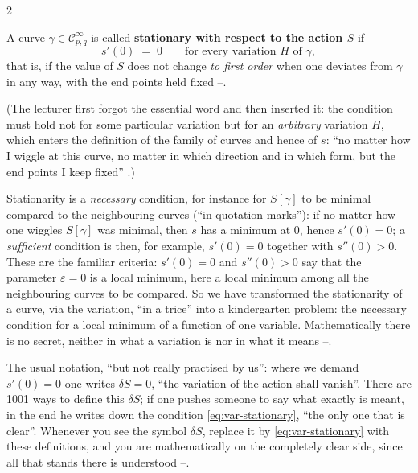 \begin{paracol}{2}
\begin{definition}\label{def:var-stationary}
A curve $\gamma\in\mathcal C^\infty_{p,q}$ is called \textbf{stationary with respect to the action $S$} if
\begin{equation}\label{eq:var-stationary}
  s'(0)\;=\;0\qquad\text{for every variation }H\text{ of }\gamma ,
\end{equation}
that is, if the value of $S$ does not change \emph{to first order} when one deviates from $\gamma$ in any way, with the end points held fixed --.
\end{definition}
(The lecturer first forgot the essential word and then inserted it: the condition must hold not for some particular variation but for an \emph{arbitrary} variation $H$, which enters the definition of the family of curves and hence of $s$: ``no matter how I wiggle at this curve, no matter in which direction and in which form, but the end points I keep fixed'' .)

\begin{coursenote}\label{cn:var-necessary}
Stationarity is a \emph{necessary} condition, for instance for $S[\gamma]$ to be minimal compared to the neighbouring curves (``in quotation marks''): if no matter how one wiggles $S[\gamma]$ was minimal, then $s$ has a minimum at $0$, hence $s'(0)=0$; a \emph{sufficient} condition is then, for example, $s'(0)=0$ together with $s''(0)>0$. These are the familiar criteria: $s'(0)=0$ and $s''(0)>0$ say that the parameter $\varepsilon=0$ is a local minimum, here a local minimum among all the neighbouring curves to be compared. So we have transformed the stationarity of a curve, via the variation, ``in a trice'' into a kindergarten problem: the necessary condition for a local minimum of a function of one variable. Mathematically there is no secret, neither in what a variation is nor in what it means --.
\end{coursenote}

\begin{coursenote}[The usual notation $\delta S=0$ (as said in class)]\label{cn:var-delta}
The usual notation, ``but not really practised by us'': where we demand $s'(0)=0$ one writes $\delta S=0$, ``the variation of the action shall vanish''. There are 1001 ways to define this $\delta S$; if one pushes someone to say what exactly is meant, in the end he writes down the condition \eqref{eq:var-stationary}, ``the only one that is clear''. Whenever you see the symbol $\delta S$, replace it by \eqref{eq:var-stationary} with these definitions, and you are mathematically on the completely clear side, since all that stands there is understood --.
\end{coursenote}


\end{paracol}
